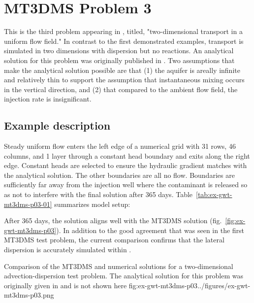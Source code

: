 \section{MT3DMS Problem 3}

This is the third problem appearing in \cite{zheng1999mt3dms}, titled, "two-dimensional transport in a uniform flow field." In contrast to the first demonstrated examples, transport is simulated in two dimensions with dispersion but no reactions. An analytical solution for this problem was originally published in \cite{wilson1978}. Two assumptions that make the analytical solution possible are that (1) the aquifer is areally infinite and relatively thin to support the assumption that instantaneous mixing occurs in the vertical direction, and (2) that compared to the ambient flow field, the injection rate is insignificant.  

\subsection{Example description}

Steady uniform flow enters the left edge of a numerical grid with 31 rows, 46 columns, and 1 layer through a constant head boundary and exits along the right edge. Constant heads are selected to ensure the hydraulic gradient matches with the analytical solution. The other boundaries are all no flow. Boundaries are sufficiently far away from the injection well where the contaminant is released so as not to interfere with the final solution after 365 days. Table~\ref{tab:ex-gwt-mt3dms-p03-01} summarizes model setup:



After 365 days, the \mf solution aligns well with the MT3DMS solution (fig.~\ref{fig:ex-gwt-mt3dms-p03}). In addition to the good agreement that was seen in the first  MT3DMS test problem, the current comparison confirms that the lateral dispersion is accurately simulated within \mf.


\begin{StandardFigure}
	{Comparison of the MT3DMS and \mf numerical solutions for a two-dimensional advection-dispersion test problem.  The analytical solution for this problem was originally given in \cite{wilson1978} and is not shown here}
	{fig:ex-gwt-mt3dms-p03}{../figures/ex-gwt-mt3dms-p03.png}
\end{StandardFigure}